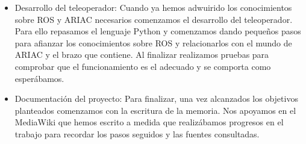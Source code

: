 \begin{itemize}
	\item Desarrollo del teleoperador:
	Cuando ya hemos adwuirido los conocimientos sobre ROS y ARIAC necesarios comenzamos el desarrollo del teleoperador. Para ello repasamos el lenguaje Python y comenzamos dando pequeños pasos para afianzar los conocimientos sobre ROS y relacionarlos con el mundo de ARIAC y el brazo que contiene. Al finalizar realizamos pruebas para comprobar que el funcionamiento es el adecuado y se comporta como esperábamos.
	
	\item Documentación del proyecto:
	Para finalizar, una vez alcanzados los objetivos planteados comenzamos con la escritura de la memoria. Nos apoyamos en el MediaWiki que hemos escrito a medida que realizábamos progresos en el trabajo para recordar los pasos seguidos y las fuentes consultadas.
	
\end{itemize}




